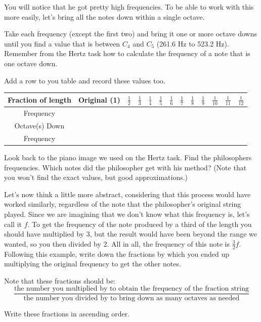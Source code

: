 \documentclass[12pt,noauthor,nooutcomes,hints,instructornotes]{ximera}%
\begin{document}
\begin{question} You will notice that he got pretty high frequencies. To be able to work with this more easily, let's bring all the notes down within a single octave.

Take each frequency (except the first two) and bring it one or more octave downs until you find a value that is between $C_4$ and $C_5$ (261.6 Hz to 523.2 Hz). Remember from the Hertz task how to calculate the frequency of a note that is one octave down.

Add a row to you table and record these values too.

\begin{center}
\renewcommand{\arraystretch}{3}
\begin{tabular}{|c|c|c|c|c|c|c|c|c|c|c|c|c|}\hline
Fraction of length & Original (1) & $\frac{1}{2}$ & $\frac{1}{3}$ & $\frac{1}{4}$ & $\frac{1}{5}$  & $\frac{1}{6}$ & $\frac{1}{7}$ & $\frac{1}{8}$ & $\frac{1}{9}$ & $\frac{1}{10}$ & $\frac{1}{11}$ & $\frac{1}{12}$    \\\hline
Frequency & &&&&&&&&&&& \\\hline
Octave(s) Down & &&&&&&&&&&&\\
Frequency & &&&&&&&&&&& \\\hline
\end{tabular}
\end{center}
\end{question}
\begin{question} Look back to the piano image we used on the Hertz task. Find the philosophers frequencies. Which notes did the philosopher get with his method? (Note that you won't find the exact values, but good approximations.)
\end{question}

\begin{question} 
Let's now think a little more abstract, considering that this process would have worked similarly, regardless of the note that the philosopher's original string played. Since we are imagining that we don't know what this frequency is, let's call it $f$. To get the frequency of the note produced by a third of the length you should have multiplied by 3, but the result would have been beyond the range we wanted, so you then divided by 2. All in all, the frequency of this note is $\frac{3}{2}f$. Following this example, write down the fractions by which you ended up multiplying the original frequency to get the other notes.

Note that these fractions should be:
\[
\dfrac{\text{the number you multiplied by to obtain the frequency of the fraction string}}{\text{the number you divided by to bring down as many octaves as needed}}
\]

Write these fractions in ascending order.

\end{question}
\end{document}
